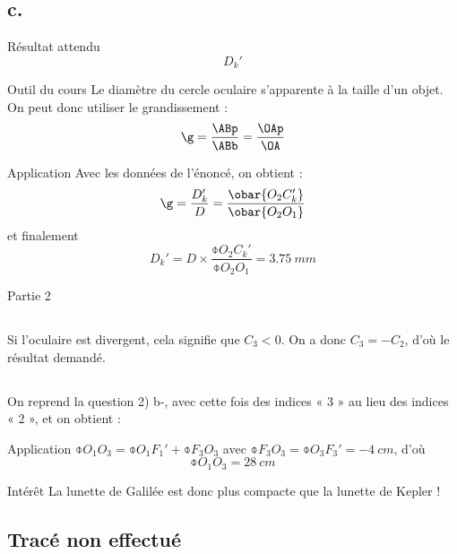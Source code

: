 \documentclass[../main/main.tex]{subfiles}
\begin{document}
\setcounter{subsection}{2}
\subsection{c.}
\begin{NCprop}{Résultat attendu}
    $$D_k'$$
\end{NCprop}

\begin{NCdemo}{Outil du cours}
    Le diamètre du cercle oculaire s'apparente à la taille d'un objet. On peut
    donc utiliser le grandissement :
    \[ \g = \frac{\ABp}{\ABb} = \frac{\OAp}{\OA} \]
\end{NCdemo}

\begin{NCexem}{Application}
    Avec les données de l'énoncé, on obtient :
    \[ \g = \frac{D_k'}{D} = \frac{\obar{O_2C_k'}}{\obar{O_2O_1}}\]
    et finalement
    \[ \boxed{D_k' = D\times \frac{\obar{O_2C_k'}}{\obar{O_2O_1}} =
    \SI{3.75}{mm}} \]
\end{NCexem}

\begin{center}
    \huge Partie 2
\end{center}

\subsection{}
Si l'oculaire est divergent, cela signifie que $C_3 < 0$. On a donc $C_3 = -
C_2$, d'où le résultat demandé.

\subsection{}
On reprend la question 2) b-, avec cette fois des indices « 3 » au lieu des
indices « 2 », et on obtient :

\begin{NCexem}{Application}
    $\obar{O_1O_3} = \obar{O_1F_1'} + \obar{F_3O_3}$ avec $\obar{F_3O_3} =
    \obar{O_3F_3'} = \SI{-4}{cm}$, d'où
    \[ \boxed{\obar{O_1O_3} = \SI{+28}{cm}} \]
\end{NCexem}

\begin{inte}{Intérêt}
    La lunette de Galilée est donc plus compacte que la lunette de Kepler !
\end{inte}

\subsection{Tracé non effectué}
\end{document}
